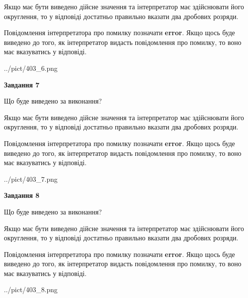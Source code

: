 \documentclass[12pt, ukrainian]{article}
\begin{document}
{\begin {Large}
Якщо має бути виведено дійсне значення та інтерпретатор має здійснювати його округлення, 
то у відповіді достатньо правильно вказати два дробових розряди.

Повідомлення інтерпретатора про помилку позначати \textbf{error}.
Якщо щось буде виведено до того, як інтерпретатор видасть повідомлення про помилку, 
то воно має вказуватись у відповіді. \par

\begin{center}
	{../pict/403_6.png}
\end{center}
\newpage

{\begin {center}\textbf{Завдання 7}\end {center}}\par
Що буде виведено за виконання? \par

Якщо має бути виведено дійсне значення та інтерпретатор має здійснювати його округлення, 
то у відповіді достатньо правильно вказати два дробових розряди.

Повідомлення інтерпретатора про помилку позначати \textbf{error}.
Якщо щось буде виведено до того, як інтерпретатор видасть повідомлення про помилку, 
то воно має вказуватись у відповіді. \par

\begin{center}
	{../pict/403_7.png}
\end{center}
\newpage

{\begin {center}\textbf{Завдання 8}\end {center}}\par
Що буде виведено за виконання? \par

Якщо має бути виведено дійсне значення та інтерпретатор має здійснювати його округлення, 
то у відповіді достатньо правильно вказати два дробових розряди.

Повідомлення інтерпретатора про помилку позначати \textbf{error}.
Якщо щось буде виведено до того, як інтерпретатор видасть повідомлення про помилку, 
то воно має вказуватись у відповіді. \par

\begin{center}
	{../pict/403_8.png}
\end{center}
\newpage


\end{Large}}
\end{document}
